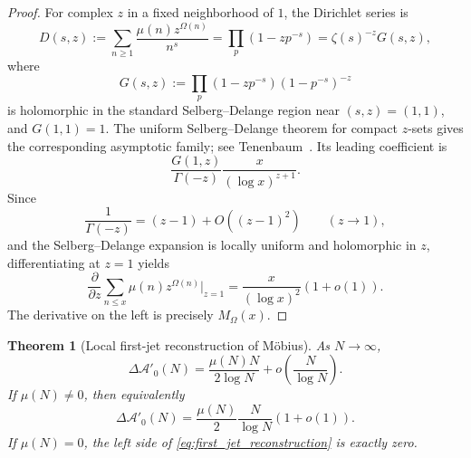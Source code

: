 \documentclass[11pt]{amsart}
\numberwithin{equation}{section}
\theoremstyle{plain}
\newtheorem{theorem}{Theorem}[section]
\theoremstyle{definition}
\theoremstyle{remark}
\begin{document}
\begin{proof}
For complex \(z\) in a fixed neighborhood of \(1\), the Dirichlet series is
\begin{equation}
D(s,z)
:=\sum_{n\ge1}\frac{\mu(n)z^{\Omega(n)}}{n^s}
=\prod_p(1-zp^{-s})
=\zeta(s)^{-z}G(s,z),
\label{eq:Dsz_selberg_delange}
\end{equation}
where
\begin{equation}
G(s,z):=
\prod_p(1-zp^{-s})(1-p^{-s})^{-z}
\label{eq:Gsz_definition}
\end{equation}
is holomorphic in the standard Selberg--Delange region near \((s,z)=(1,1)\),
and \(G(1,1)=1\).  The uniform Selberg--Delange theorem for compact
\(z\)-sets gives the corresponding asymptotic family; see
Tenenbaum~\cite{Tenenbaum2015}.  Its leading coefficient is
\begin{equation}
\frac{G(1,z)}{\Gamma(-z)}
\frac{x}{(\log x)^{z+1}}.
\label{eq:SD_leading_family}
\end{equation}
Since
\begin{equation}
\frac1{\Gamma(-z)}=(z-1)+O((z-1)^2)
\qquad(z\to1),
\label{eq:gamma_zero_at_one}
\end{equation}
and the Selberg--Delange expansion is locally uniform and holomorphic in
\(z\), differentiating at \(z=1\) yields
\begin{equation}
\frac{\partial}{\partial z}
\sum_{n\le x}\mu(n)z^{\Omega(n)}\Big|_{z=1}
=\frac{x}{(\log x)^2}(1+o(1)).
\label{eq:SD_derivative_at_one}
\end{equation}
The derivative on the left is precisely \(M_\Omega(x)\).
\end{proof}

\begin{theorem}[Local first-jet reconstruction of M\"obius]
\label{thm:first_jet_reconstruction}
As \(N\to\infty\),
\begin{equation}
\boxed{
\Delta\mathcal A'_0(N)
=
\frac{\mu(N)N}{2\log N}
+o\!\left(\frac{N}{\log N}\right).}
\label{eq:first_jet_reconstruction}
\end{equation}
If \(\mu(N)\ne0\), then equivalently
\begin{equation}
\Delta\mathcal A'_0(N)
=
\frac{\mu(N)}2\frac{N}{\log N}(1+o(1)).
\label{eq:first_jet_reconstruction_squarefree}
\end{equation}
If \(\mu(N)=0\), the left side of
\eqref{eq:first_jet_reconstruction} is exactly zero.
\end{theorem}
\end{document}
